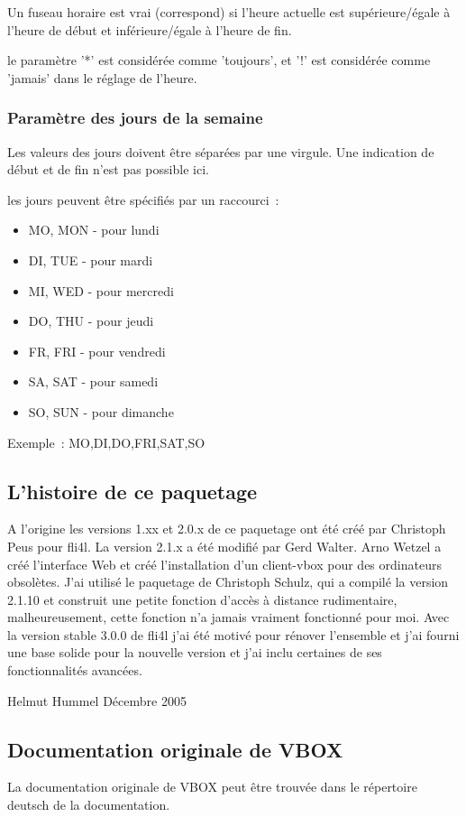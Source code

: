 Un fuseau horaire est vrai (correspond) si l'heure actuelle est supérieure/égale à
l'heure de début et inférieure/égale à l'heure de fin.

le paramètre '*' est considérée comme 'toujours', et '!' est considérée comme 'jamais'
dans le réglage de l'heure.

\subsubsection{Paramètre des jours de la semaine}
Les valeurs des jours doivent être séparées par une virgule.
Une indication de début et de fin n'est pas possible ici.

les jours peuvent être spécifiés par un raccourci~:
\begin{itemize}
    \item MO, MON - pour lundi
    \item DI, TUE - pour mardi
    \item MI, WED - pour mercredi
    \item DO, THU - pour jeudi
    \item FR, FRI - pour vendredi
    \item SA, SAT - pour samedi
    \item SO, SUN - pour dimanche
\end{itemize}

Exemple~:
MO,DI,DO,FRI,SAT,SO

\subsection{L'histoire de ce paquetage}
A l'origine les versions 1.xx et 2.0.x de ce paquetage ont été créé par Christoph Peus
pour fli4l. La version 2.1.x a été modifié par Gerd Walter. Arno Wetzel a créé l'interface
Web et créé l'installation d'un client-vbox pour des ordinateurs obsolètes. J'ai utilisé
le paquetage de Christoph Schulz, qui a compilé la version 2.1.10 et construit une petite
fonction d'accès à distance rudimentaire, malheureusement, cette fonction n'a jamais vraiment
fonctionné pour moi. Avec la version stable 3.0.0 de fli4l j'ai été motivé pour rénover
l'ensemble et j'ai fourni une base solide pour la nouvelle version et j'ai inclu certaines de
ses fonctionnalités avancées.

Helmut Hummel Décembre 2005

\subsection{Documentation originale de VBOX}

La documentation originale de VBOX peut être trouvée dans le répertoire deutsch de la documentation.
